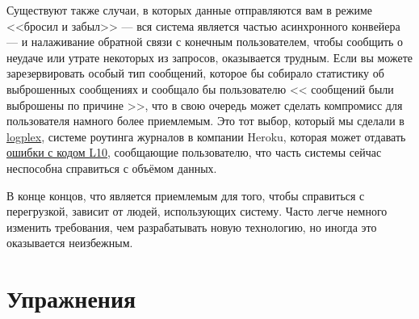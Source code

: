 Существуют также случаи, в которых данные отправляются вам в режиме <<бросил и забыл>> --- вся система является частью асинхронного конвейера --- и налаживание обратной связи с конечным пользователем, чтобы сообщить о неудаче или утрате некоторых из запросов, оказывается трудным. Если вы можете зарезервировать особый тип сообщений, которое бы собирало статистику об выброшенных сообщениях и сообщало бы пользователю << сообщений были выброшены по причине >>, что в свою очередь может сделать компромисс для пользователя намного более приемлемым. Это тот выбор, который мы сделали в \href{https://devcenter.heroku.com/articles/logplex}{logplex}, системе роутинга журналов в компании Heroku, которая может отдавать \href{https://devcenter.heroku.com/articles/error-codes\#l10-drain-buffer-overflow}{ошибки с кодом L10}, сообщающие пользователю, что часть системы сейчас неспособна справиться с объёмом данных.

В конце концов, что является приемлемым для того, чтобы справиться с перегрузкой, зависит от людей, использующих систему. Часто легче немного изменить требования, чем разрабатывать новую технологию, но иногда это оказывается неизбежным.


\section{Упражнения}

\subsection*{\ReviewTitle{}}

